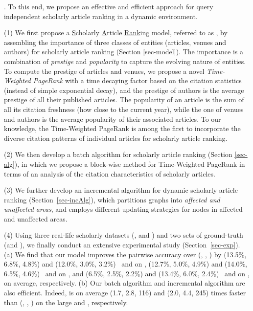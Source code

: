 .
To this end, we propose an effective and efficient approach for query independent scholarly article ranking in a dynamic environment.

\sstab(1) We first  propose a \underline{S}cholarly \underline{A}rticle \underline{Rank}ing model, referred to as \ensemblerank, by assembling the importance of three classes of entities (articles, venues and authors) for scholarly article ranking (Section \ref{sec-model}).
%
The importance is a combination of {\em prestige} and {\em popularity} to capture the evolving nature of entities.
%
To compute the prestige of articles and venues, we propose a novel {\em Time-Weighted PageRank} with a time decaying factor based on the citation statistics (instead of simple exponential decay), and the prestige of authors is the average prestige of all their published articles.
%
The popularity of an article is the sum of all its citation freshness (how close to the current year), while the one of venues and authors is the average popularity of their associated articles.
%
%
To our knowledge, the Time-Weighted PageRank is among the first to incorporate the diverse citation patterns of individual articles for scholarly article ranking.

\sstab(2)  We then develop  a batch algorithm for scholarly article ranking (Section \ref{sec-alg}), in which we propose a block-wise method for Time-Weighted PageRank in terms of an analysis of the citation characteristics of scholarly articles.


\sstab(3)
We further develop an incremental algorithm for dynamic scholarly article ranking (Section~\ref{sec-incAlg}), which partitions graphs into  {\em affected and unaffected areas}, and employs different updating strategies for nodes in affected and unaffected areas.


\sstab(4) Using three real-life scholarly datasets (\aan, \aminer and \magdata) and two sets of ground-truth (\recom and \fcita), we finally conduct an extensive experimental study (Section~\ref{sec-exp}).
(a) We find that our model \ensemblerank improves the pairwise accuracy \cite{Richardson06:BPR} over (\pagerank \cite{Brin98:PageRank}, \futurerank \cite{sayyadi09}, \hhgrank \cite{Liang16AAAI}) by
(13.5\%, 6.8\%, 4.8\%) and (12.0\%, 3.0\%, 3.2\%) \wrt\ \recom and \fcita  on \aan,
(12.7\%, 5.0\%, 4.9\%) and (14.0\%, 6.5\%, 4.6\%) \wrt\ \recom and \fcita on \aminer, and
(6.5\%, 2.5\%, 2.2\%) and (13.4\%, 6.0\%, 2.4\%) \wrt\ \recom and \fcita on \magdata, on average, respectively.
%
(b) Our batch algorithm \batensemble and incremental algorithm \incensemble are also efficient. Indeed, \incensemble is on average (1.7, 2.8, 116) and (2.0, 4.4, 245) times faster than (\batensemble, \futurerank, \hhgrank)  on the large \aminer and \magdata, respectively.

